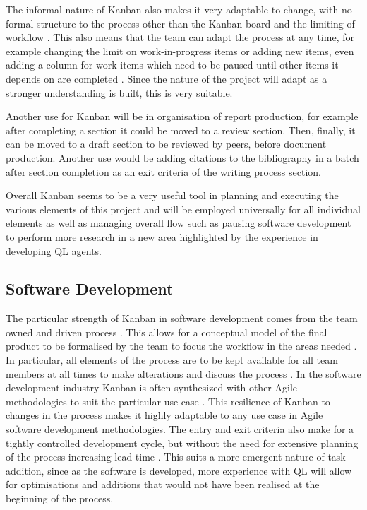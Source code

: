 \documentclass[hidelinks,journal]{IEEEtran}
\begin{document}
The informal nature of Kanban also makes it very adaptable to change, with no formal structure to the process other than the Kanban board and the limiting of workflow \parencite{Mahnic13}. This also means that the team can adapt the process at any time, for example changing the limit on work-in-progress items or adding new items, even adding a column for work items which need to be paused until other items it depends on are completed \textcite{Ahmad17}. Since the nature of the project will adapt as a stronger understanding is built, this is very suitable.

Another use for Kanban will be in organisation of report production, for example after completing a section it could be moved to a review section. Then, finally, it can be moved to a draft section to be reviewed  by peers, before document production. Another use would be adding citations to the bibliography in a batch after section completion as an exit criteria of the writing process section.

Overall Kanban seems to be a very useful tool in planning and executing the various elements of this project and will be employed universally for all individual elements as well as managing overall flow such as pausing software development to perform more research in a new area highlighted by the experience in developing QL agents.
\subsection{Software Development}
\label{subsec:mthdSoftDev}
The particular strength of Kanban in software development comes from the team owned and driven process \parencite{Matharu15}. This allows for a conceptual model of the final product to be formalised by the team to focus the workflow in the areas needed \parencite{Matharu15}. In particular, all elements of the process are to be kept available for all team members at all times to make alterations and discuss the process \parencite{Mahnic13}. In the software development industry Kanban is often synthesized with other Agile methodologies to suit the particular use case \parencite{Ahmad17}. This resilience of Kanban to changes in the process makes it highly adaptable to any use case in Agile software development methodologies. The entry and exit criteria also make for a tightly controlled development cycle, but without the need for extensive planning of the process increasing lead-time \parencite{Ahmad17}. This suits a more emergent nature of task addition, since as the software is developed, more experience with QL will allow for optimisations and additions that would not have been realised at the beginning of the process.
\end{document}
